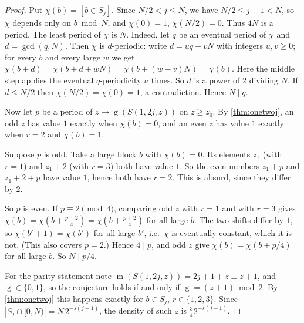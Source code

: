 \documentclass[11pt]{amsart}
\theoremstyle{definition}
\theoremstyle{remark}
\newcommand{\gv}{\operatorname{g}}           %
\newcommand{\m}{\operatorname{m}}
\newcommand{\Sp}{S}
\begin{document}
\begin{proof}
Put $\chi(b)=[b\in S_j]$. Since $N/2<j\le N$, we have $N/2\le j-1<N$, so $\chi$ depends only on $b\bmod N$, and $\chi(0)=1$, $\chi(N/2)=0$. Thus $4N$ is a period. The least period of $\chi$ is $N$. Indeed, let $q$ be an eventual period of $\chi$ and $d=\gcd(q,N)$. Then $\chi$ is $d$-periodic: write $d=uq-vN$ with integers $u,v\ge0$; for every $b$ and every large $w$ we get $\chi(b+d)=\chi(b+d+wN)=\chi(b+(w-v)N)=\chi(b)$. Here the middle step applies the eventual $q$-periodicity $u$ times. So $d$ is a power of $2$ dividing $N$. If $d\le N/2$ then $\chi(N/2)=\chi(0)=1$, a contradiction. Hence $N\mid q$.

Now let $p$ be a period of $z\mapsto\gv(\Sp(1,2j,z))$ on $z\ge z_0$. By \cref{thm:onetwoj}, an odd $z$ has value $1$ exactly when $\chi(b)=0$, and an even $z$ has value $1$ exactly when $r=2$ and $\chi(b)=1$.

Suppose $p$ is odd. Take a large block $b$ with $\chi(b)=0$. Its elements $z_1$ (with $r=1$) and $z_1+2$ (with $r=3$) both have value $1$. So the even numbers $z_1+p$ and $z_1+2+p$ have value $1$, hence both have $r=2$. This is absurd, since they differ by $2$.

So $p$ is even. If $p\equiv 2\pmod 4$, comparing odd $z$ with $r=1$ and with $r=3$ gives $\chi(b)=\chi(b+\frac{p-2}{4})=\chi(b+\frac{p+2}{4})$ for all large $b$. The two shifts differ by $1$, so $\chi(b'+1)=\chi(b')$ for all large $b'$, i.e.\ $\chi$ is eventually constant, which it is not. (This also covers $p=2$.) Hence $4\mid p$, and odd $z$ give $\chi(b)=\chi(b+p/4)$ for all large $b$. So $N\mid p/4$.

For the parity statement note $\m(\Sp(1,2j,z))=2j+1+z\equiv z+1$, and $\gv\in\{0,1\}$, so the conjecture holds if and only if $\gv=(z+1)\bmod 2$. By \cref{thm:onetwoj} this happens exactly for $b\in S_j$, $r\in\{1,2,3\}$. Since $|S_j\cap[0,N)|=N\,2^{-s(j-1)}$, the density of such $z$ is $\tfrac34 2^{-s(j-1)}$.
\end{proof}
\end{document}
